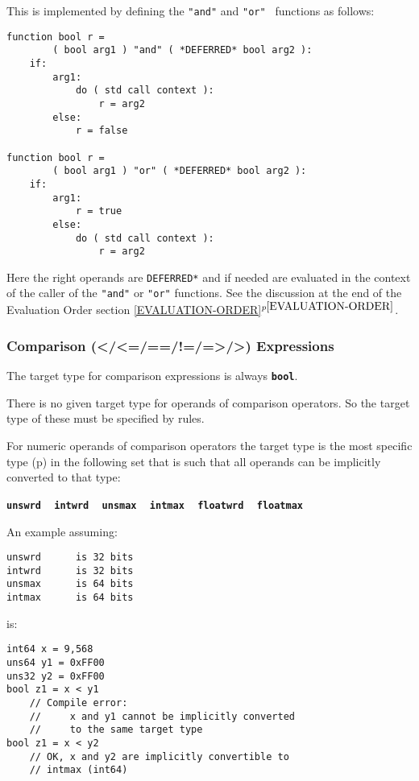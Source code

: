 \documentclass[12pt]{article}
\newcommand{\TT}[1]{{\tt \bfseries #1}}
\newcommand{\itemref}[1]{\ref{#1}$^{p\pageref{#1}}$}
\newcommand{\pagref}[1]{p\pageref{#1}}
\newenvironment{indpar}[1][0.3in]%
	{\begin{list}{}%
		     {\setlength{\itemsep}{0in}%
		      \setlength{\topsep}{0in}%
		      \setlength{\parsep}{1ex}%
		      \setlength{\labelwidth}{#1}%
		      \setlength{\leftmargin}{#1}%
		      \addtolength{\leftmargin}{\labelsep}}%
	 \item}%
	{\end{list}}
\begin{document}
This is implemented by defining
the {\tt "and"} and {\tt "or" } functions as follows:

\begin{indpar}\begin{verbatim}
function bool r =
        ( bool arg1 ) "and" ( *DEFERRED* bool arg2 ):
    if:
        arg1:
            do ( std call context ):
                r = arg2
        else:
            r = false

function bool r =
        ( bool arg1 ) "or" ( *DEFERRED* bool arg2 ):
    if:
        arg1:
            r = true
        else:
            do ( std call context ):
                r = arg2
\end{verbatim}\end{indpar}

Here the right operands are {\tt *DEFERRED*} and if needed are
evaluated in the context of the caller of the {\tt "and"} or
{\tt "or"} functions.
See the discussion at the end of the Evaluation Order section
\itemref{EVALUATION-ORDER}.


\subsubsection{Comparison (</<=/==/!=/=>/>) Expressions}
\label{COMPARISON-EXPRESSIONS}

The target type for comparison expressions is always \TT{bool}.

There is no given target type for operands of comparison operators.
So the target type of these must be specified by rules.

For numeric operands of comparison operators
the target type is the most specific type (\pagref{MORE-SPECIFIC-RELATION})
in the following set that is such that all operands
can be implicitly converted to that type:
\begin{center}
\TT{unswrd} ~ \TT{intwrd} ~ \TT{unsmax} ~ \TT{intmax}
           ~ \TT{floatwrd} ~ \TT{floatmax}
\end{center}

An example assuming:


\begin{indpar}\begin{verbatim}
unswrd      is 32 bits
intwrd      is 32 bits
unsmax      is 64 bits
intmax      is 64 bits
\end{verbatim}\end{indpar}

is:

\begin{indpar}\begin{verbatim}
int64 x = 9,568
uns64 y1 = 0xFF00
uns32 y2 = 0xFF00
bool z1 = x < y1
    // Compile error:
    //     x and y1 cannot be implicitly converted
    //     to the same target type
bool z1 = x < y2
    // OK, x and y2 are implicitly convertible to
    // intmax (int64)
\end{verbatim}\end{indpar}
\end{document}
